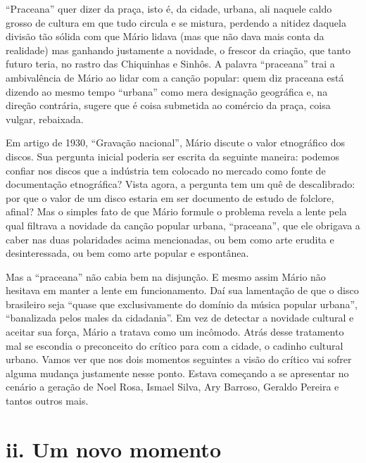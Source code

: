 ``Praceana'' quer dizer da praça, isto é, da cidade, urbana, ali naquele
caldo grosso de cultura em que tudo circula e se mistura, perdendo a
nitidez daquela divisão tão sólida com que Mário lidava (mas que não
dava mais conta da realidade) mas ganhando justamente a novidade, o
frescor da criação, que tanto futuro teria, no rastro das Chiquinhas e
Sinhôs. A palavra ``praceana'' trai a ambivalência de Mário ao lidar com
a canção popular: quem diz praceana está dizendo ao mesmo tempo
``urbana'' como mera designação geográfica e, na direção contrária,
sugere que é coisa submetida ao comércio da praça, coisa vulgar,
rebaixada.

Em artigo de 1930, ``Gravação nacional'', Mário discute o valor
etnográfico dos discos. Sua pergunta inicial poderia ser escrita da
seguinte maneira: podemos confiar nos discos que a indústria tem
colocado no mercado como fonte de documentação etnográfica? Vista agora,
a pergunta tem um quê de descalibrado: por que o valor de um disco
estaria em ser documento de estudo de folclore, afinal? Mas o simples
fato de que Mário formule o problema revela a lente pela qual filtrava a
novidade da canção popular urbana, ``praceana'', que ele obrigava a
caber nas duas polaridades acima mencionadas, ou bem como arte erudita e
desinteressada, ou bem como arte popular e espontânea.

Mas a ``praceana'' não cabia bem na disjunção. E mesmo assim Mário não
hesitava em manter a lente em funcionamento. Daí sua lamentação de que o
disco brasileiro seja ``quase que exclusivamente do domínio da música
popular urbana'', ``banalizada pelos males da cidadania''. Em vez de
detectar a novidade cultural e aceitar sua força, Mário a tratava como
um incômodo. Atrás desse tratamento mal se escondia o preconceito do
crítico para com a cidade, o cadinho cultural urbano. Vamos ver que nos
dois momentos seguintes a visão do crítico vai sofrer alguma mudança
justamente nesse ponto. Estava começando a se apresentar no cenário a
geração de Noel Rosa, Ismael Silva, Ary Barroso, Geraldo Pereira e
tantos outros mais.

\section{ii. Um novo momento}

